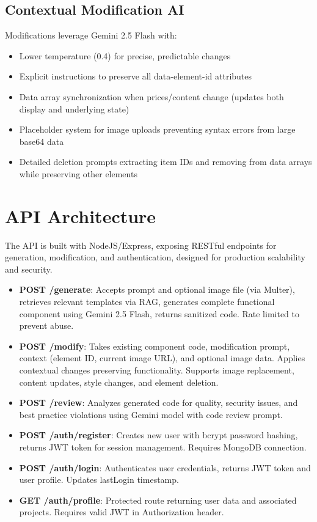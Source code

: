 \documentclass[10pt, conference, letterpaper]{IEEEtran}
\begin{document}
\subsection{Contextual Modification AI}
Modifications leverage Gemini 2.5 Flash with:
\begin{itemize}
    \item Lower temperature (0.4) for precise, predictable changes
    \item Explicit instructions to preserve all data-element-id attributes
    \item Data array synchronization when prices/content change (updates both display and underlying state)
    \item Placeholder system for image uploads preventing syntax errors from large base64 data
    \item Detailed deletion prompts extracting item IDs and removing from data arrays while preserving other elements
\end{itemize}

\section{API Architecture}
The API is built with NodeJS/Express, exposing RESTful endpoints for generation, modification, and authentication, designed for production scalability and security.

\begin{itemize}
    \item \textbf{POST /generate}: Accepts prompt and optional image file (via Multer), retrieves relevant templates via RAG, generates complete functional component using Gemini 2.5 Flash, returns sanitized code. Rate limited to prevent abuse.
    \item \textbf{POST /modify}: Takes existing component code, modification prompt, context (element ID, current image URL), and optional image data. Applies contextual changes preserving functionality. Supports image replacement, content updates, style changes, and element deletion.
    \item \textbf{POST /review}: Analyzes generated code for quality, security issues, and best practice violations using Gemini model with code review prompt.
    \item \textbf{POST /auth/register}: Creates new user with bcrypt password hashing, returns JWT token for session management. Requires MongoDB connection.
    \item \textbf{POST /auth/login}: Authenticates user credentials, returns JWT token and user profile. Updates lastLogin timestamp.
    \item \textbf{GET /auth/profile}: Protected route returning user data and associated projects. Requires valid JWT in Authorization header.
\end{itemize}
\end{document}
